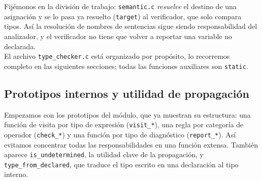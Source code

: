 \documentclass[12pt,letterpaper]{article}
\begin{document}
\bigskip

Fijémonos en la división de trabajo: \texttt{semantic.c} \emph{resuelve} el destino de una asignación y se lo
pasa ya resuelto (\texttt{target}) al verificador, que solo compara tipos. Así la resolución de nombres de
sentencias sigue siendo responsabilidad del analizador, y el verificador no tiene que volver a reportar una
variable no declarada.\\

El archivo \texttt{type\_checker.c} está organizado por propósito, lo recorremos completo en las siguientes
secciones; todas las funciones auxiliares son \texttt{static}.

\subsection*{Prototipos internos y utilidad de propagación}

Empezamos con los prototipos del módulo, que ya muestran su estructura: una función de visita por tipo de
expresión (\texttt{visit\_*}), una regla por categoría de operador (\texttt{check\_*}) y una función por tipo
de diagnóstico (\texttt{report\_*}). Así evitamos concentrar todas las responsabilidades en una función extensa.
También aparece \texttt{is\_undetermined}, la utilidad clave de la propagación, y \texttt{type\_from\_declared},
que traduce el tipo escrito en una declaración al tipo interno.
\end{document}
